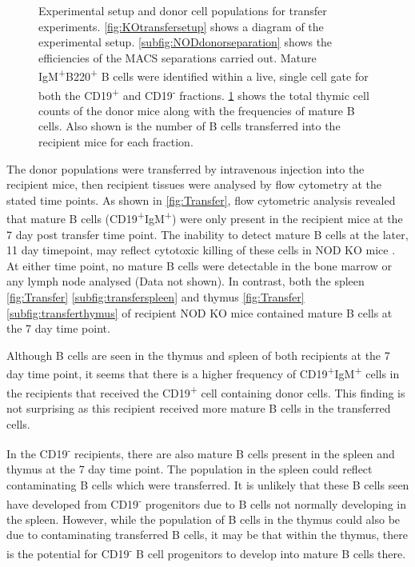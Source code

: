 \begin{figure}
\begin{subfigure}{0.5\textwidth}
	\label{subfig:WTdonortable}
	\end{subfigure}
\caption[Experimental setup and donor cell populations for transfer experiments]{Experimental setup and donor cell populations for transfer experiments.
\ref{fig:KOtransfersetup} shows a diagram of the experimental setup.
\ref{subfig:NODdonorseparation} shows the efficiencies of the MACS separations carried out. Mature IgM\textsuperscript{+}B220\textsuperscript{+} B cells were identified within a live, single cell gate for both the CD19\textsuperscript{+} and CD19\textsuperscript{-} fractions.
\ref{subfig:WTdonortable} shows the total thymic cell counts of the donor mice along with the frequencies of mature B cells. Also shown is the number of B cells transferred into the recipient mice for each fraction.}
\label{fig:Transfersetup}
\end{figure}
	
	
The donor populations were transferred by intravenous injection into the recipient mice, then recipient tissues were analysed by flow cytometry at the stated time points.
As shown in \cref{fig:Transfer}, flow cytometric analysis revealed that mature B cells (CD19\textsuperscript{+}IgM\textsuperscript{+}) were only present in the recipient mice at the 7 day post transfer time point.
The inability to detect mature B cells at the later, 11 day timepoint, may reflect cytotoxic killing of these cells in NOD KO mice \citep{Serreze1998}.
At either time point, no mature B cells were detectable in the bone marrow or any lymph node analysed (Data not shown).
In contrast, both the spleen \cref{fig:Transfer} \ref{subfig:transferspleen} and thymus \cref{fig:Transfer} \ref{subfig:transferthymus} of recipient NOD KO mice contained mature B cells at the 7 day time point.


Although B cells are seen in the thymus and spleen of both recipients at the 7 day time point, it seems that there is a higher frequency of CD19\textsuperscript{+}IgM\textsuperscript{+} cells in the recipients that received the CD19\textsuperscript{+} cell containing donor cells.
This finding is not surprising as this recipient received more mature B cells in the transferred cells.

In the CD19\textsuperscript{-} recipients, there are also mature B cells present in the spleen and thymus at the 7 day time point.
The population in the spleen could reflect contaminating B cells which were transferred. 
It is unlikely that these B cells seen have developed from CD19\textsuperscript{-} progenitors due to B cells not normally developing in the spleen.
However, while the population of B cells in the thymus could also be due to contaminating transferred B cells, it may be that within the thymus, there is the potential for CD19\textsuperscript{-} B cell progenitors to develop into mature B cells there.


